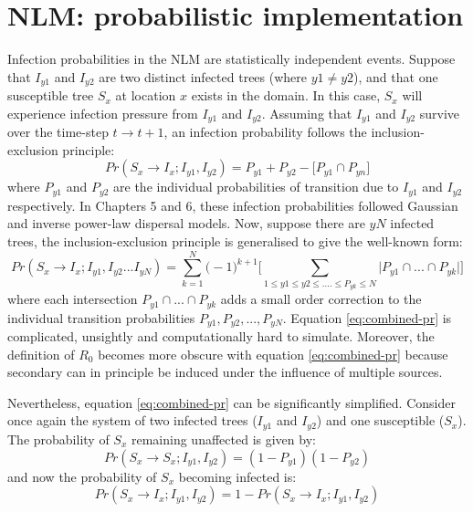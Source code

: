 \newpage

\section{NLM: probabilistic implementation}
\label{A:combiniing-probabilities}

Infection probabilities in the NLM are statistically independent events.
Suppose that $I_{y1}$ and $I_{y2}$ are two distinct infected trees (where $y1 \neq y2$), and that one susceptible tree $S_x$ at location $x$ exists in the domain.
In this case, $S_x$ will experience infection pressure from $I_{y1}$ and $I_{y2}$.
Assuming that $I_{y1}$ and $I_{y2}$ survive over the time-step $t \rightarrow t + 1$, an infection probability follows the inclusion-exclusion principle:
\begin{equation}
    Pr(S_x \rightarrow I_{x}; I_{y1}, I_{y2}) = P_{y1} + P_{y2} - \big[ P_{y1} \cap P_{yn} \big] 
\end{equation}
where $P_{y1}$ and $P_{y2}$ are the individual probabilities of transition due to $I_{y1}$ and $I_{y2}$ respectively.
In Chapters 5 and 6, these infection probabilities followed Gaussian and inverse power-law dispersal models.
Now, suppose there are $yN$ infected trees, the inclusion-exclusion principle is generalised to give the well-known form:
\begin{equation}
\label{eq:combined-pr}
     Pr(S_x \rightarrow I_{x}; I_{y1}, I_{y2}...I_{yN}) = \sum_{k=1}^{N} \big(  -1 \big)^{k+1} \Big[ \sum _{1\leq y1 \leq y2 \leq....\leq P_{yk} \leq N} \big| P_{y1}\cap ...\cap P_{yk}  \big|   \Big]
\end{equation}
where each intersection $P_{y1} \cap ... \cap P_{yk}$ adds a small order correction to the individual transition probabilities $P_{y1}, P_{y2},..., P_{yN}$.
Equation \ref{eq:combined-pr} is complicated, unsightly and computationally hard to simulate.
Moreover, the definition of $R_0$ becomes more obscure with equation \ref{eq:combined-pr} because secondary can in principle be induced under the influence of multiple sources.

Nevertheless, equation \ref{eq:combined-pr} can be significantly simplified. 
Consider once again the system of two infected trees ($I_{y1}$ and $I_{y2}$) and one susceptible ($S_x$).
The probability of $S_x$ remaining unaffected is given by:
\begin{equation}
    Pr(S_x \rightarrow S_{x}; I_{y1}, I_{y2}) = (1 - P_{y1})(1 -P_{y2})
\end{equation}
and now the probability of $S_x$ becoming infected is:
\begin{equation}
\label{eq:pr-simp}
    Pr(S_x \rightarrow I_{x}; I_{y1}, I_{y2}) = 1 - Pr(S_x \rightarrow I_{x}; I_{y1}, I_{y2})
\end{equation}

